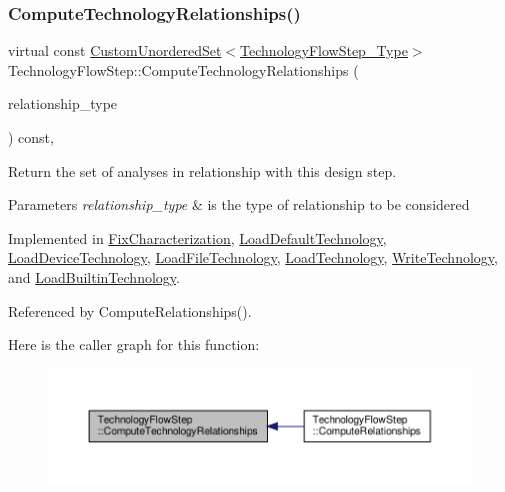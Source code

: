 \subsubsection{\texorpdfstring{Compute\+Technology\+Relationships()}{ComputeTechnologyRelationships()}}
{\footnotesize\ttfamily virtual const \hyperlink{classCustomUnorderedSet}{Custom\+Unordered\+Set}$<$\hyperlink{technology__flow__step_8hpp_a65208cfec963a7d7def292f9db428292}{Technology\+Flow\+Step\+\_\+\+Type}$>$ Technology\+Flow\+Step\+::\+Compute\+Technology\+Relationships (\begin{DoxyParamCaption}\item[{const \hyperlink{classDesignFlowStep_a723a3baf19ff2ceb77bc13e099d0b1b7}{Design\+Flow\+Step\+::\+Relationship\+Type}}]{relationship\+\_\+type }\end{DoxyParamCaption}) const\hspace{0.3cm}{\ttfamily [protected]}, {}}



Return the set of analyses in relationship with this design step. 


\begin{DoxyParams}{Parameters}
{\em relationship\+\_\+type} & is the type of relationship to be considered \\
\hline
\end{DoxyParams}


Implemented in \hyperlink{classFixCharacterization_a01b2fe97c0c10544d6dbc2671eedd35a}{Fix\+Characterization}, \hyperlink{classLoadDefaultTechnology_a7c86cdd7c8b95b248a7bca14cc1d81f3}{Load\+Default\+Technology}, \hyperlink{classLoadDeviceTechnology_a5db6b3f94fc4252f2104c37c0ac21ce7}{Load\+Device\+Technology}, \hyperlink{classLoadFileTechnology_ae698944e39fc273e5821302bbc45e62e}{Load\+File\+Technology}, \hyperlink{classLoadTechnology_a2e08243cc28d6a0a11e258f84c1ec0fa}{Load\+Technology}, \hyperlink{classWriteTechnology_a08646671bc7e22d2929cb41de50ed7bb}{Write\+Technology}, and \hyperlink{classLoadBuiltinTechnology_af45215c91a262842995c29fb1e79c8c9}{Load\+Builtin\+Technology}.



Referenced by Compute\+Relationships().

Here is the caller graph for this function\+:
\nopagebreak
\begin{figure}[H]
\begin{center}
\leavevmode
\includegraphics[width=350pt]{d9/deb/classTechnologyFlowStep_ab543169c9b0143c8ae8831d765519075_icgraph}
\end{center}
\end{figure}
\mbox{\label{classTechnologyFlowStep_addcc035c454c244798b6d260b35eeae7}} 
